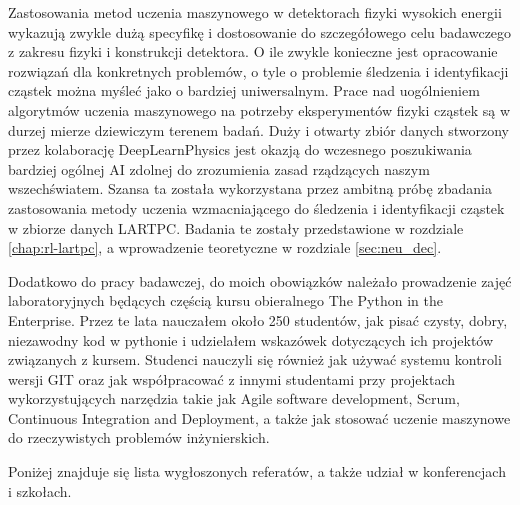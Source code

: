 Zastosowania metod uczenia maszynowego w detektorach fizyki wysokich energii wykazują zwykle dużą specyfikę i dostosowanie do szczegółowego celu badawczego z zakresu fizyki i konstrukcji detektora.
O ile zwykle konieczne jest opracowanie rozwiązań dla konkretnych problemów, o tyle o problemie śledzenia i identyfikacji cząstek można myśleć jako o bardziej uniwersalnym.
Prace nad uogólnieniem algorytmów uczenia maszynowego na potrzeby eksperymentów fizyki cząstek są w durzej mierze dziewiczym terenem badań.
Duży i otwarty zbiór danych stworzony przez kolaborację DeepLearnPhysics jest okazją do wczesnego poszukiwania bardziej ogólnej AI zdolnej do zrozumienia zasad rządzących naszym wszechświatem.
Szansa ta została wykorzystana przez ambitną próbę zbadania zastosowania metody uczenia wzmacniającego do śledzenia i identyfikacji cząstek w zbiorze danych LARTPC.
Badania te zostały przedstawione w rozdziale \ref{chap:rl-lartpc}, a wprowadzenie teoretyczne w rozdziale \ref{sec:neu_dec}.

Dodatkowo do pracy badawczej, do moich obowiązków należało prowadzenie zajęć laboratoryjnych będących częścią kursu obieralnego The Python in the Enterprise. Przez te lata nauczałem około 250 studentów, jak pisać czysty, dobry, niezawodny kod w pythonie i udzielałem wskazówek dotyczących ich projektów związanych z kursem. Studenci nauczyli się również jak używać systemu kontroli wersji GIT oraz jak współpracować z innymi studentami przy projektach wykorzystujących narzędzia takie jak Agile software development, Scrum, Continuous Integration and Deployment, a także jak stosować uczenie maszynowe do rzeczywistych problemów inżynierskich.

Poniżej znajduje się lista wygłoszonych referatów, a także udział w konferencjach i szkołach.

\newpage